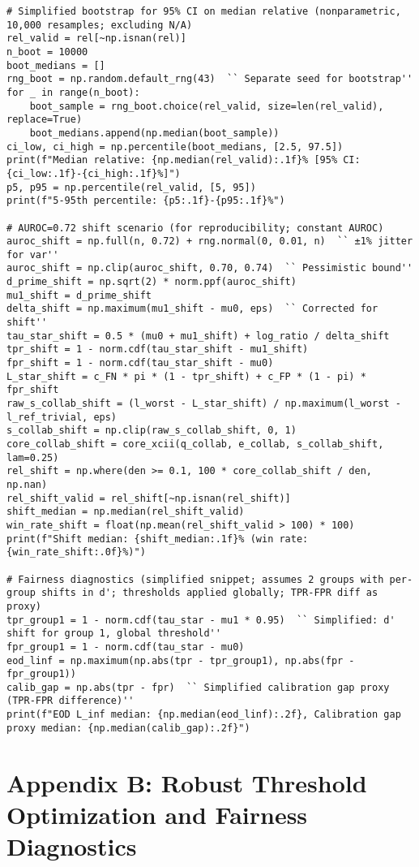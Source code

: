 \documentclass{article}
\begin{document}
\begin{lstlisting}
# Simplified bootstrap for 95% CI on median relative (nonparametric, 10,000 resamples; excluding N/A)
rel_valid = rel[~np.isnan(rel)]
n_boot = 10000
boot_medians = []
rng_boot = np.random.default_rng(43)  `` Separate seed for bootstrap''
for _ in range(n_boot):
    boot_sample = rng_boot.choice(rel_valid, size=len(rel_valid), replace=True)
    boot_medians.append(np.median(boot_sample))
ci_low, ci_high = np.percentile(boot_medians, [2.5, 97.5])
print(f"Median relative: {np.median(rel_valid):.1f}% [95% CI: {ci_low:.1f}-{ci_high:.1f}%]")
p5, p95 = np.percentile(rel_valid, [5, 95])
print(f"5-95th percentile: {p5:.1f}-{p95:.1f}%")

# AUROC=0.72 shift scenario (for reproducibility; constant AUROC)
auroc_shift = np.full(n, 0.72) + rng.normal(0, 0.01, n)  `` ±1% jitter for var''
auroc_shift = np.clip(auroc_shift, 0.70, 0.74)  `` Pessimistic bound''
d_prime_shift = np.sqrt(2) * norm.ppf(auroc_shift)
mu1_shift = d_prime_shift
delta_shift = np.maximum(mu1_shift - mu0, eps)  `` Corrected for shift''
tau_star_shift = 0.5 * (mu0 + mu1_shift) + log_ratio / delta_shift
tpr_shift = 1 - norm.cdf(tau_star_shift - mu1_shift)
fpr_shift = 1 - norm.cdf(tau_star_shift - mu0)
L_star_shift = c_FN * pi * (1 - tpr_shift) + c_FP * (1 - pi) * fpr_shift
raw_s_collab_shift = (l_worst - L_star_shift) / np.maximum(l_worst - l_ref_trivial, eps)
s_collab_shift = np.clip(raw_s_collab_shift, 0, 1)
core_collab_shift = core_xcii(q_collab, e_collab, s_collab_shift, lam=0.25)
rel_shift = np.where(den >= 0.1, 100 * core_collab_shift / den, np.nan)
rel_shift_valid = rel_shift[~np.isnan(rel_shift)]
shift_median = np.median(rel_shift_valid)
win_rate_shift = float(np.mean(rel_shift_valid > 100) * 100)
print(f"Shift median: {shift_median:.1f}% (win rate: {win_rate_shift:.0f}%)")

# Fairness diagnostics (simplified snippet; assumes 2 groups with per-group shifts in d'; thresholds applied globally; TPR-FPR diff as proxy)
tpr_group1 = 1 - norm.cdf(tau_star - mu1 * 0.95)  `` Simplified: d' shift for group 1, global threshold''
fpr_group1 = 1 - norm.cdf(tau_star - mu0)
eod_linf = np.maximum(np.abs(tpr - tpr_group1), np.abs(fpr - fpr_group1))
calib_gap = np.abs(tpr - fpr)  `` Simplified calibration gap proxy (TPR-FPR difference)''
print(f"EOD L_inf median: {np.median(eod_linf):.2f}, Calibration gap proxy median: {np.median(calib_gap):.2f}")
\end{lstlisting}

\section*{Appendix B: Robust Threshold Optimization and Fairness Diagnostics}
\end{document}
